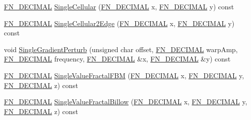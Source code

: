 \begin{DoxyCompactItemize}
\item 
\mbox{\hyperlink{_fast_noise_8h_a75a9ef6d2541c4921815b885bfd449c3}{F\+N\+\_\+\+D\+E\+C\+I\+M\+AL}} \mbox{\hyperlink{class_fast_noise_a9729b73152368fb1c494bf4ab7cbe19e}{Single\+Cellular}} (\mbox{\hyperlink{_fast_noise_8h_a75a9ef6d2541c4921815b885bfd449c3}{F\+N\+\_\+\+D\+E\+C\+I\+M\+AL}} x, \mbox{\hyperlink{_fast_noise_8h_a75a9ef6d2541c4921815b885bfd449c3}{F\+N\+\_\+\+D\+E\+C\+I\+M\+AL}} y) const
\item 
\mbox{\hyperlink{_fast_noise_8h_a75a9ef6d2541c4921815b885bfd449c3}{F\+N\+\_\+\+D\+E\+C\+I\+M\+AL}} \mbox{\hyperlink{class_fast_noise_a2b9280204ddb0ffe0b8c3c6502cfe05e}{Single\+Cellular2\+Edge}} (\mbox{\hyperlink{_fast_noise_8h_a75a9ef6d2541c4921815b885bfd449c3}{F\+N\+\_\+\+D\+E\+C\+I\+M\+AL}} x, \mbox{\hyperlink{_fast_noise_8h_a75a9ef6d2541c4921815b885bfd449c3}{F\+N\+\_\+\+D\+E\+C\+I\+M\+AL}} y) const
\item 
void \mbox{\hyperlink{class_fast_noise_a10f8238bf167c02937ad19c0f081549a}{Single\+Gradient\+Perturb}} (unsigned char offset, \mbox{\hyperlink{_fast_noise_8h_a75a9ef6d2541c4921815b885bfd449c3}{F\+N\+\_\+\+D\+E\+C\+I\+M\+AL}} warp\+Amp, \mbox{\hyperlink{_fast_noise_8h_a75a9ef6d2541c4921815b885bfd449c3}{F\+N\+\_\+\+D\+E\+C\+I\+M\+AL}} frequency, \mbox{\hyperlink{_fast_noise_8h_a75a9ef6d2541c4921815b885bfd449c3}{F\+N\+\_\+\+D\+E\+C\+I\+M\+AL}} \&x, \mbox{\hyperlink{_fast_noise_8h_a75a9ef6d2541c4921815b885bfd449c3}{F\+N\+\_\+\+D\+E\+C\+I\+M\+AL}} \&y) const
\item 
\mbox{\hyperlink{_fast_noise_8h_a75a9ef6d2541c4921815b885bfd449c3}{F\+N\+\_\+\+D\+E\+C\+I\+M\+AL}} \mbox{\hyperlink{class_fast_noise_a9189fa5c0fa9d9871290ade57dabe022}{Single\+Value\+Fractal\+F\+BM}} (\mbox{\hyperlink{_fast_noise_8h_a75a9ef6d2541c4921815b885bfd449c3}{F\+N\+\_\+\+D\+E\+C\+I\+M\+AL}} x, \mbox{\hyperlink{_fast_noise_8h_a75a9ef6d2541c4921815b885bfd449c3}{F\+N\+\_\+\+D\+E\+C\+I\+M\+AL}} y, \mbox{\hyperlink{_fast_noise_8h_a75a9ef6d2541c4921815b885bfd449c3}{F\+N\+\_\+\+D\+E\+C\+I\+M\+AL}} z) const
\item 
\mbox{\hyperlink{_fast_noise_8h_a75a9ef6d2541c4921815b885bfd449c3}{F\+N\+\_\+\+D\+E\+C\+I\+M\+AL}} \mbox{\hyperlink{class_fast_noise_ac2534a36b0dfb1c6337a512787511754}{Single\+Value\+Fractal\+Billow}} (\mbox{\hyperlink{_fast_noise_8h_a75a9ef6d2541c4921815b885bfd449c3}{F\+N\+\_\+\+D\+E\+C\+I\+M\+AL}} x, \mbox{\hyperlink{_fast_noise_8h_a75a9ef6d2541c4921815b885bfd449c3}{F\+N\+\_\+\+D\+E\+C\+I\+M\+AL}} y, \mbox{\hyperlink{_fast_noise_8h_a75a9ef6d2541c4921815b885bfd449c3}{F\+N\+\_\+\+D\+E\+C\+I\+M\+AL}} z) const

\end{DoxyCompactItemize}
